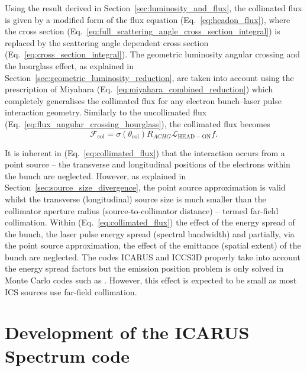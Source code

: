 \documentclass[../main.tex]{subfiles}
\begin{document}
Using the result derived in Section~\ref{sec:luminosity_and_flux}, the collimated flux is given by a modified form of the flux equation (Eq.~\ref{eq:headon_flux}), where the cross section (Eq.~\ref{eq:full_scattering_angle_cross_section_integral}) is replaced by the scattering angle dependent cross section (Eq.~\ref{eq:cross_section_integral}). The geometric luminosity angular crossing and the  hourglass effect, as explained in Section~\ref{sec:geometric_luminosity_reduction}, are taken into account using the prescription of Miyahara (Eq.~\ref{eq:miyahara_combined_reduction}) which completely generalises the collimated flux for any electron bunch--laser pulse interaction geometry. Similarly to  the uncollimated flux (Eq.~\ref{eq:flux_angular_crossing_hourglass}), the collimated flux becomes
\begin{equation}
\mathcal{F}_{\mathrm{col}} = \sigma\left(\theta_{\mathrm{col}}\right) R_{ACHG}\mathcal{L}_{\mathrm{HEAD-ON}}f.
\label{eq:collimated_flux}
\end{equation}

It is inherent in (Eq.~\ref{eq:collimated_flux}) that the interaction occurs from a point source -- the transverse and longitudinal positions of the electrons within the bunch are neglected. However, as explained in Section~\ref{sec:source_size_divergence}, the point source approximation is valid whilst the transverse (longitudinal) source size is much smaller than the collimator aperture radius (source-to-collimator distance) -- termed far-field collimation. Within (Eq.~\ref{eq:collimated_flux}) the effect of the energy spread of the bunch, the laser pulse energy spread (spectral bandwidth) and partially, via the point source approximation, the effect of the emittance (spatial extent) of the bunch are neglected. The codes \textsc{ICARUS} and \textsc{ICCS3D} \cite{krafft2016laser,ranjan2018simulation} properly take into account the energy spread factors but the emission position problem is only solved in Monte Carlo codes such as  \cite{chen1995cain}. However, this effect is expected to be small as most ICS sources use far-field collimation.

\section{Development of the ICARUS Spectrum code}
\label{sec:development_of_the_ICARUS_spectrum_code}
\end{document}
